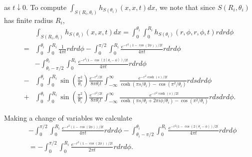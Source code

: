 \documentclass{amsart}
\theoremstyle{definition}
\begin{document}
as $t \downarrow 0$.  
To compute $\int_{S(R_i, \theta_i)} h_{S(\theta_i)}(x,x,t) dx$, we note that since $S(R_i, \theta_i)$ has finite radius $R_i$, 
\begin{align*}
    &\int_{S(R_i, \theta_i)} h_{S(\theta_i)}(x,x,t) dx = \int_0^{\theta_i}\int_0^{R_i} h_{S(\theta_i)}(r, \phi, r, \phi, t) rdrd\phi \\
     = &\int_0^{\theta_i}\int_0^{R_i} \frac{1}{4\pi t} rdrd\phi  -  \int_0 ^{\pi/2}\int_0 ^{R_i}  \frac{e^{-r^2(1-\cos(2\phi))/2t}}{4\pi t} rdr d\phi \\ 
     & - \int_{\theta_i-\pi/2} ^{\theta_i} \int_0 ^{R_i} \frac{e^{-r^2(1-\cos(2(\theta_i-\phi))/2t}}{4\pi t} r dr d\phi \\
        - &\int_0^{\theta_i}\int_0^{R_i} \sin\left(\frac{\pi^2}{\theta_i}\right) \frac{e^{-r^2/2t}}{8\pi\theta_i t} \int_{-\infty}^\infty \frac{e^{-r^2\cosh(s)/2t}}{\cosh(\pi s/\theta_i) - \cos(\pi^2/\theta_i)} rds drd\phi \\
        + &\int_0^{\theta_i}\int_0^{R_i} \sin\left(\frac{\pi^2}{\theta_i}\right) \frac{e^{-r^2/2t}}{8\pi\theta_i t} \int_{-\infty}^\infty \frac{e^{-r^2\cosh(s)/2t}}{\cosh(\pi s/\theta_i + 2\pi i\phi/\theta_i) - \cos(\pi^2/\theta_i)} rds drd\phi.
\end{align*}

Making a change of variables we calculate 
\begin{align*} &-  \int_0 ^{\pi/2}\int_0 ^{R_i}  \frac{e^{-r^2(1-\cos(2\phi))/2t}}{4\pi t} rdr d\phi  - \int_{\theta_i-\pi/2} ^{\theta_i} \int_0 ^{R_i} \frac{e^{-r^2(1-\cos(2(\theta_i-\phi))/2t}}{4\pi t} r dr d\phi \\ &= - \int_0 ^{\pi/2} \int_0 ^{R_i} \frac{e^{-r^2(1-\cos(2\phi))/2t}}{2\pi t} r dr d\phi. 
\end{align*}
\end{document}
